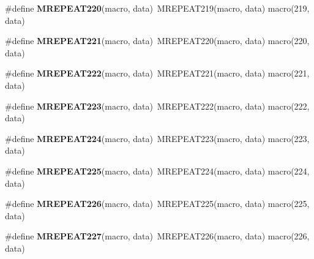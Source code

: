 \begin{DoxyCompactItemize}
\item 
\hypertarget{group__group__sam0__utils__mrepeat_ga87b159389edf9a6b6f2e0fcf17139964}{}\#define {\bfseries M\+R\+E\+P\+E\+A\+T220}(macro,  data)~M\+R\+E\+P\+E\+A\+T219(macro, data)   macro(219, data)\label{group__group__sam0__utils__mrepeat_ga87b159389edf9a6b6f2e0fcf17139964}

\item 
\hypertarget{group__group__sam0__utils__mrepeat_ga8b900659b10dcbf3db345acef26f242c}{}\#define {\bfseries M\+R\+E\+P\+E\+A\+T221}(macro,  data)~M\+R\+E\+P\+E\+A\+T220(macro, data)   macro(220, data)\label{group__group__sam0__utils__mrepeat_ga8b900659b10dcbf3db345acef26f242c}

\item 
\hypertarget{group__group__sam0__utils__mrepeat_ga8a7acdd582f6480ff0ba12258858670f}{}\#define {\bfseries M\+R\+E\+P\+E\+A\+T222}(macro,  data)~M\+R\+E\+P\+E\+A\+T221(macro, data)   macro(221, data)\label{group__group__sam0__utils__mrepeat_ga8a7acdd582f6480ff0ba12258858670f}

\item 
\hypertarget{group__group__sam0__utils__mrepeat_ga6d10ab8a91d39e5445dd73345376b1c0}{}\#define {\bfseries M\+R\+E\+P\+E\+A\+T223}(macro,  data)~M\+R\+E\+P\+E\+A\+T222(macro, data)   macro(222, data)\label{group__group__sam0__utils__mrepeat_ga6d10ab8a91d39e5445dd73345376b1c0}

\item 
\hypertarget{group__group__sam0__utils__mrepeat_ga3b9133ba29da0660d2b743093e68538a}{}\#define {\bfseries M\+R\+E\+P\+E\+A\+T224}(macro,  data)~M\+R\+E\+P\+E\+A\+T223(macro, data)   macro(223, data)\label{group__group__sam0__utils__mrepeat_ga3b9133ba29da0660d2b743093e68538a}

\item 
\hypertarget{group__group__sam0__utils__mrepeat_ga7a35ac51829f1231cd1f15d17bd69e90}{}\#define {\bfseries M\+R\+E\+P\+E\+A\+T225}(macro,  data)~M\+R\+E\+P\+E\+A\+T224(macro, data)   macro(224, data)\label{group__group__sam0__utils__mrepeat_ga7a35ac51829f1231cd1f15d17bd69e90}

\item 
\hypertarget{group__group__sam0__utils__mrepeat_ga4a34529f9fa47949482c0d37bdacd3c8}{}\#define {\bfseries M\+R\+E\+P\+E\+A\+T226}(macro,  data)~M\+R\+E\+P\+E\+A\+T225(macro, data)   macro(225, data)\label{group__group__sam0__utils__mrepeat_ga4a34529f9fa47949482c0d37bdacd3c8}

\item 
\hypertarget{group__group__sam0__utils__mrepeat_ga395d7e09979a131155a9b2fcfa84b06e}{}\#define {\bfseries M\+R\+E\+P\+E\+A\+T227}(macro,  data)~M\+R\+E\+P\+E\+A\+T226(macro, data)   macro(226, data)\label{group__group__sam0__utils__mrepeat_ga395d7e09979a131155a9b2fcfa84b06e}


\end{DoxyCompactItemize}
